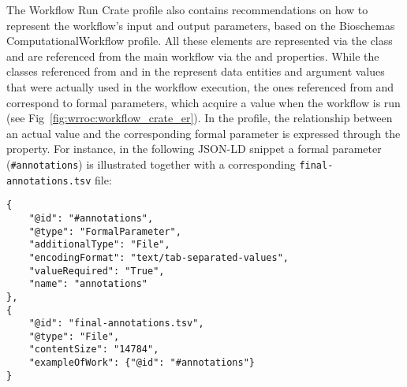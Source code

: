 The Workflow Run Crate profile also contains recommendations on how to represent the workflow's input and output parameters, based on the Bioschemas ComputationalWorkflow profile.
All these elements are represented via the  class and are referenced from the main workflow via the  and
 properties.
While the classes referenced from
 and  in the  represent data entities and argument values that were actually used in the workflow execution, the ones referenced from  and
 correspond to formal parameters, which acquire a value when the workflow is run (see Fig~\ref{fig:wrroc:workflow_crate_er}).
In the profile, the relationship between an actual value and the corresponding formal parameter is expressed through the  property.
For instance, in the following JSON-LD snippet a formal parameter (\texttt{\#annotations}) is illustrated together with a corresponding \texttt{final-annotations.tsv} file:
%
\begin{verbatim}
{
    "@id": "#annotations",
    "@type": "FormalParameter",
    "additionalType": "File",
    "encodingFormat": "text/tab-separated-values",
    "valueRequired": "True",
    "name": "annotations"
},
{
    "@id": "final-annotations.tsv",
    "@type": "File",
    "contentSize": "14784",
    "exampleOfWork": {"@id": "#annotations"}
}
\end{verbatim}


